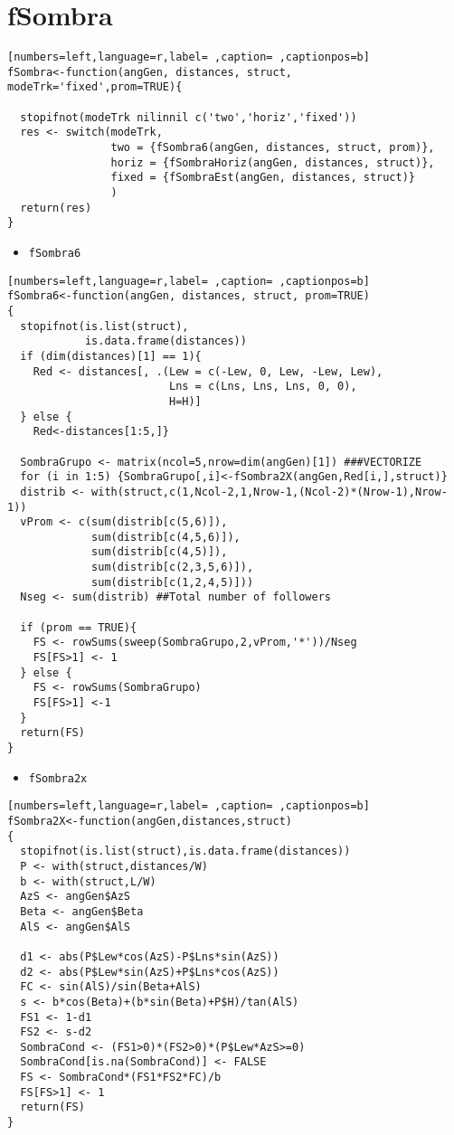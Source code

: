 \section{fSombra}
\label{sec:org7adc481}
\begin{lstlisting}[numbers=left,language=r,label= ,caption= ,captionpos=b]
fSombra<-function(angGen, distances, struct, modeTrk='fixed',prom=TRUE){

  stopifnot(modeTrk nilinnil c('two','horiz','fixed'))
  res <- switch(modeTrk, 
                two = {fSombra6(angGen, distances, struct, prom)},
                horiz = {fSombraHoriz(angGen, distances, struct)},
                fixed = {fSombraEst(angGen, distances, struct)}
                )
  return(res)
}
\end{lstlisting}
\begin{itemize}
\item \texttt{fSombra6}
\end{itemize}
\begin{lstlisting}[numbers=left,language=r,label= ,caption= ,captionpos=b]
fSombra6<-function(angGen, distances, struct, prom=TRUE)
{
  stopifnot(is.list(struct),
            is.data.frame(distances))
  if (dim(distances)[1] == 1){ 
    Red <- distances[, .(Lew = c(-Lew, 0, Lew, -Lew, Lew),
                         Lns = c(Lns, Lns, Lns, 0, 0),
                         H=H)]
  } else { 
    Red<-distances[1:5,]} 

  SombraGrupo <- matrix(ncol=5,nrow=dim(angGen)[1]) ###VECTORIZE
  for (i in 1:5) {SombraGrupo[,i]<-fSombra2X(angGen,Red[i,],struct)}
  distrib <- with(struct,c(1,Ncol-2,1,Nrow-1,(Ncol-2)*(Nrow-1),Nrow-1)) 
  vProm <- c(sum(distrib[c(5,6)]),
             sum(distrib[c(4,5,6)]),
             sum(distrib[c(4,5)]),
             sum(distrib[c(2,3,5,6)]),
             sum(distrib[c(1,2,4,5)]))
  Nseg <- sum(distrib) ##Total number of followers

  if (prom == TRUE){
    FS <- rowSums(sweep(SombraGrupo,2,vProm,'*'))/Nseg
    FS[FS>1] <- 1
  } else {		
    FS <- rowSums(SombraGrupo)
    FS[FS>1] <-1
  }
  return(FS)
}
\end{lstlisting}
\begin{itemize}
\item \texttt{fSombra2x}
\end{itemize}
\begin{lstlisting}[numbers=left,language=r,label= ,caption= ,captionpos=b]
fSombra2X<-function(angGen,distances,struct)
{
  stopifnot(is.list(struct),is.data.frame(distances))
  P <- with(struct,distances/W)
  b <- with(struct,L/W)
  AzS <- angGen$AzS
  Beta <- angGen$Beta
  AlS <- angGen$AlS

  d1 <- abs(P$Lew*cos(AzS)-P$Lns*sin(AzS))
  d2 <- abs(P$Lew*sin(AzS)+P$Lns*cos(AzS))
  FC <- sin(AlS)/sin(Beta+AlS)
  s <- b*cos(Beta)+(b*sin(Beta)+P$H)/tan(AlS)
  FS1 <- 1-d1
  FS2 <- s-d2
  SombraCond <- (FS1>0)*(FS2>0)*(P$Lew*AzS>=0)
  SombraCond[is.na(SombraCond)] <- FALSE 
  FS <- SombraCond*(FS1*FS2*FC)/b
  FS[FS>1] <- 1
  return(FS)
}
\end{lstlisting}
